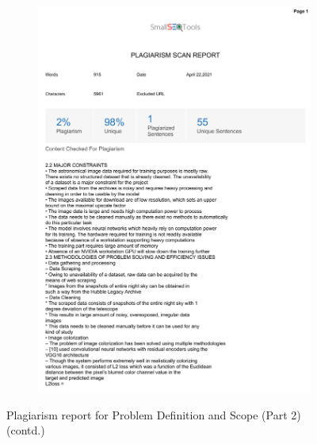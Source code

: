 \documentclass[oneside,a4paper,12pt]{report}
\begin{document}
\begin{appendices}
\begin{figure}
\begin{subfigure}[H]{\textwidth}
    	\includegraphics[scale=0.7, page=2]{plagiarism/problem_definition&scope_2.pdf}
    \end{subfigure}
    \caption{Plagiarism report for Problem Definition and Scope (Part 2) (contd.)}
    \label{PlagiarismPDS2_2}
\end{figure}


\end{appendices}
\end{document}
